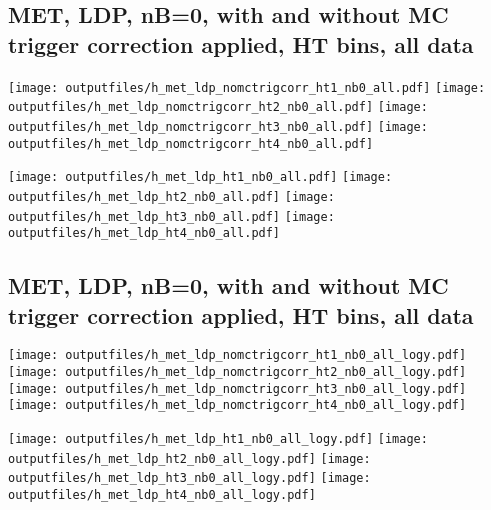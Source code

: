 \documentclass[11pt]{article}
\begin{document}
    \clearpage
     \subsection{ MET, LDP, nB=0, with and without MC trigger correction applied, HT bins, all data}

    \noindent
     \texttt{[image: outputfiles/h\_met\_ldp\_nomctrigcorr\_ht1\_nb0\_all.pdf]}
     \texttt{[image: outputfiles/h\_met\_ldp\_nomctrigcorr\_ht2\_nb0\_all.pdf]}
     \texttt{[image: outputfiles/h\_met\_ldp\_nomctrigcorr\_ht3\_nb0\_all.pdf]}
     \texttt{[image: outputfiles/h\_met\_ldp\_nomctrigcorr\_ht4\_nb0\_all.pdf]}

    \noindent
     \texttt{[image: outputfiles/h\_met\_ldp\_ht1\_nb0\_all.pdf]}
     \texttt{[image: outputfiles/h\_met\_ldp\_ht2\_nb0\_all.pdf]}
     \texttt{[image: outputfiles/h\_met\_ldp\_ht3\_nb0\_all.pdf]}
     \texttt{[image: outputfiles/h\_met\_ldp\_ht4\_nb0\_all.pdf]}

    \clearpage
     \subsection{ MET, LDP, nB=0, with and without MC trigger correction applied, HT bins, all data}

    \noindent
     \texttt{[image: outputfiles/h\_met\_ldp\_nomctrigcorr\_ht1\_nb0\_all\_logy.pdf]}
     \texttt{[image: outputfiles/h\_met\_ldp\_nomctrigcorr\_ht2\_nb0\_all\_logy.pdf]}
     \texttt{[image: outputfiles/h\_met\_ldp\_nomctrigcorr\_ht3\_nb0\_all\_logy.pdf]}
     \texttt{[image: outputfiles/h\_met\_ldp\_nomctrigcorr\_ht4\_nb0\_all\_logy.pdf]}

    \noindent
     \texttt{[image: outputfiles/h\_met\_ldp\_ht1\_nb0\_all\_logy.pdf]}
     \texttt{[image: outputfiles/h\_met\_ldp\_ht2\_nb0\_all\_logy.pdf]}
     \texttt{[image: outputfiles/h\_met\_ldp\_ht3\_nb0\_all\_logy.pdf]}
     \texttt{[image: outputfiles/h\_met\_ldp\_ht4\_nb0\_all\_logy.pdf]}


\end{document}

